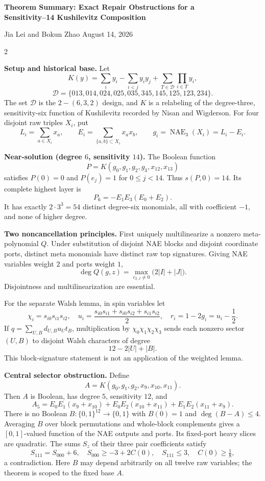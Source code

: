 \documentclass[10pt]{article}
\newcommand{\cube}[1]{\{0,1\}^{#1}}
\newcommand{\NAE}{\operatorname{NAE}}
\begin{document}
\begin{center}
  {\large\bfseries Theorem Summary: Exact Repair Obstructions for a\\[-1pt]
  Sensitivity--14 Kushilevitz Composition}\par
  \vspace{2pt}
  {\small Jia Lei and Bokun Zhao \quad August 14, 2026}
\end{center}

\vspace{-5pt}
\scriptsize
\begin{multicols}{2}

\textbf{Setup and historical base.}
Let
\[
 K(y)=\sum_i y_i-\sum_{i<j}y_iy_j+\sum_{T\in\mathcal D}\prod_{i\in T}y_i,
\]
\[
\mathcal D=\{013,014,024,025,035,345,145,125,123,234\}.
\]
The set $\mathcal D$ is the $2\!-\!(6,3,2)$ design, and $K$ is a relabeling
of the degree-three, sensitivity-six function of Kushilevitz recorded by
Nisan and Wigderson.  For four disjoint raw triples $X_i$, put
\[
 L_i=\sum_{a\in X_i}x_a,\qquad
 E_i=\sum_{\{a,b\}\subset X_i}x_ax_b,\qquad
 g_i=\NAE_3(X_i)=L_i-E_i.
\]

\textbf{Near-solution (degree \(6\), sensitivity \(14\)).}
The Boolean function
\[
 P=K(g_0,g_1,g_2,g_3,x_{12},x_{13})
\]
satisfies $P(0)=0$ and $P(e_j)=1$ for $0\le j<14$.  Thus
$s(P,0)=14$.  Its complete highest layer is
\[
 P_6=-E_1E_3(E_0+E_2).
\]
It has exactly $2\cdot3^3=54$ distinct degree-six monomials, all with
coefficient $-1$, and none of higher degree.

\textbf{Two noncancellation principles.}
First uniquely multilinearize a nonzero meta-polynomial $Q$.  Under substitution of
disjoint NAE blocks and disjoint coordinate ports, distinct meta monomials
have distinct raw top signatures.  Giving NAE variables weight $2$ and ports
weight $1$,
\[
 \deg Q(g,z)=\max_{c_{I,J}\ne0}\bigl(2|I|+|J|\bigr).
\]
Disjointness and multilinearization are essential.

For the separate Walsh lemma, in spin variables let
\[
 \chi_i=s_{i0}s_{i1}s_{i2},\quad
 u_i=\frac{s_{i0}s_{i1}+s_{i0}s_{i2}+s_{i1}s_{i2}}2,\quad
 r_i=1-2g_i=u_i-\frac12.
\]
If $q=\sum_{U,B}d_{U,B}u_Ut_B$, multiplication by
$\chi_0\chi_1\chi_2\chi_3$ sends each nonzero sector $(U,B)$ to disjoint
Walsh characters of degree
\[
 12-2|U|+|B|.
\]
This block-signature statement is not an application of the weighted lemma.

\textbf{Central selector obstruction.}
Define
\[
 A=K(g_0,g_1,g_2,x_9,x_{10},x_{11}).
\]
Then $A$ is Boolean, has degree $5$, sensitivity $12$, and
\[
 A_5=E_0E_1(x_9+x_{10})+E_0E_2(x_{10}+x_{11})
      +E_1E_2(x_{11}+x_9).
\]
There is no Boolean $B:\cube{12}\to\{0,1\}$ with
$B(0)=1$ and $\deg(B-A)\le4$.  Averaging $B$ over block permutations and
whole-block complements gives a $[0,1]$-valued function of the NAE outputs and
ports.  Its fixed-port heavy slices are quadratic.  The sums $S_z$ of their
three pair coefficients satisfy
\[
 S_{111}=S_{000}+6,\quad
 S_{000}\ge-3+2C(0),\quad S_{111}\le3,\quad C(0)\ge\tfrac18,
\]
a contradiction.  Here $B$ may depend arbitrarily on all twelve raw variables;
the theorem is scoped to the fixed base $A$.


\end{multicols}
\end{document}
